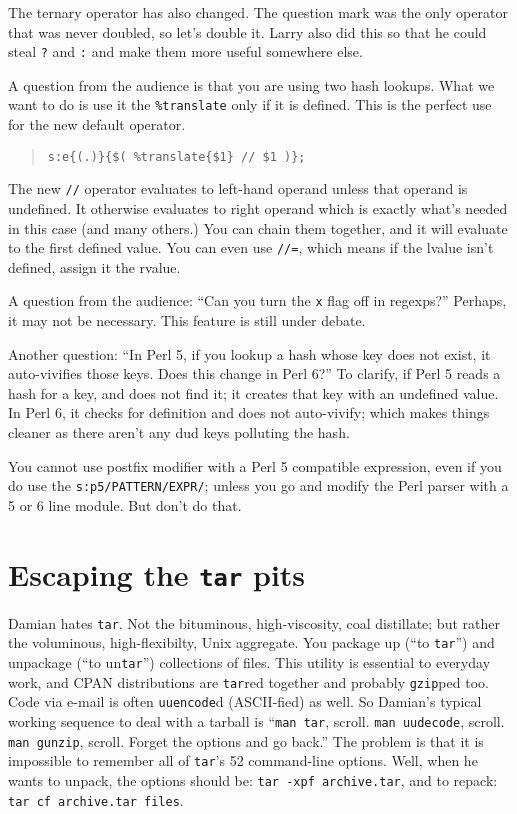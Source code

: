 \documentclass{article}
\begin{document}
The ternary operator has also changed.  The question mark was the only
operator that was never doubled, so let's double it.   Larry also did
this so that he could steal \verb'?' and \verb':' and make them more
useful somewhere else.

A question from the audience is that you are using two hash lookups.
What we want to do is use it the \verb'%translate' only if it is 
defined.  This is the perfect use for the new default operator.
\begin{quote}
\begin{verbatim}
s:e{(.)}{$( %translate{$1} // $1 )};
\end{verbatim}
\end{quote}
The new \verb'//' operator evaluates to left-hand operand unless that
operand is undefined.  It otherwise evaluates to right operand which is
exactly what's needed in this case (and many others.)  You can chain
them together, and it will evaluate to the first defined value.  You can
even use \verb'//=', which means if the lvalue isn't defined, assign it
the rvalue.

A question from the audience: ``Can you turn the \verb'x' flag off in
regexps?''  Perhaps, it may not be necessary.  This feature is still
under debate.

Another question: ``In Perl 5, if you lookup a hash whose key does not
exist, it auto-vivifies those keys.  Does this change in Perl 6?''  
To clarify, if Perl 5 reads a hash for a key, and does not find it; it
creates that key with an undefined value.  In Perl 6, it checks for 
definition and does not auto-vivify; which makes things cleaner as there
aren't any dud keys polluting the hash.

You cannot use postfix modifier with a Perl 5 compatible
expression, even if you do use the \verb's:p5/PATTERN/EXPR/'; 
unless you go and modify the Perl parser with a 5
or 6 line module.  But don't do that.

\section{Escaping the \texttt{tar} pits}
Damian hates \verb'tar'.  Not the bituminous, high-viscosity, coal
distillate; but rather the voluminous, high-flexibilty, Unix aggregate.
You package up (``to \verb'tar''') and unpackage (``to un\verb'tar''')
collections of files.  This utility is essential to everyday work, and
CPAN distributions are \verb'tar'red together and probably
\verb'gzip'ped too.  Code via e-mail is often \verb'uuencode'd
(ASCII-fied) as well.  So Damian's typical working sequence to deal with
a tarball is ``\verb'man tar', scroll.  \verb'man uudecode', scroll.
\verb'man gunzip', scroll.  Forget the options and go back.'' The
problem is that it is impossible to remember all of \verb'tar''s 52
command-line options.  Well, when he wants to unpack, the options should
be: \verb'tar -xpf archive.tar', and to repack: 
\verb'tar cf archive.tar files'.
\end{document}
